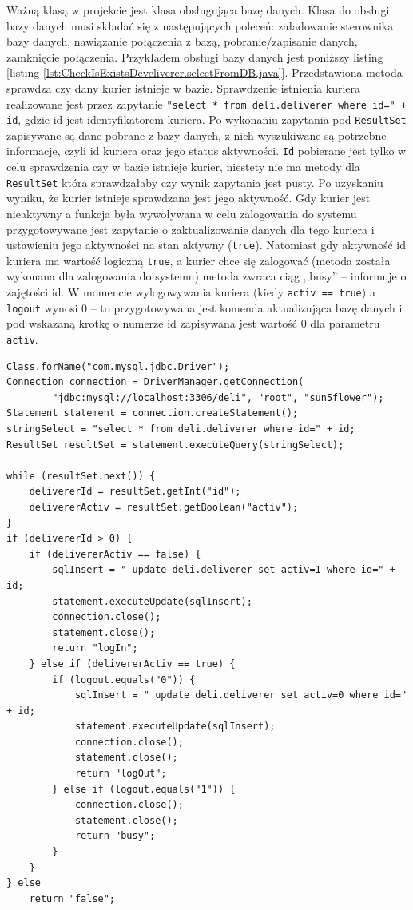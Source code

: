 \documentclass[eng,printmode,oneside]{mgr}
\begin{document}
Ważną klasą w projekcie jest klasa obsługująca bazę danych. Klasa do obsługi
bazy danych musi składać się z następujących poleceń: załadowanie sterownika
bazy danych, nawiązanie połączenia z bazą, pobranie/zapisanie danych, zamknięcie
połączenia. Przykładem obsługi bazy danych jest poniższy listing [listing
\ref{lst:CheckIsExistsDeveliverer.selectFromDB.java}]. Przedstawiona metoda
sprawdza czy dany kurier istnieje w bazie. Sprawdzenie istnienia
kuriera realizowane jest przez zapytanie \texttt{"select * from deli.deliverer where id=" + id}, gdzie id jest
identyfikatorem kuriera. Po wykonaniu zapytania pod \texttt{ResultSet}
zapisywane są dane pobrane z bazy danych, z nich wyszukiwane są potrzebne informacje, czyli
id kuriera oraz jego status aktywności. \texttt{Id} pobierane jest tylko w celu
sprawdzenia czy w bazie istnieje kurier, niestety nie ma metody dla
\texttt{ResultSet} która sprawdzałaby czy wynik zapytania jest pusty. Po
uzyskaniu wyniku, że kurier istnieje sprawdzana jest jego aktywność. Gdy kurier
jest nieaktywny a funkcja była wywoływana w celu zalogowania do systemu
przygotowywane jest zapytanie o zaktualizowanie danych dla tego kuriera i
ustawieniu jego aktywności na stan aktywny (\texttt{true}). Natomiast gdy
aktywność id kuriera ma wartość logiczną \texttt{true}, a kurier chce się
zalogować (metoda została wykonana dla zalogowania do systemu) metoda zwraca
ciąg ,,busy'' -- informuje o zajętości id.
W momencie wylogowywania kuriera (kiedy \texttt{activ == true}) a
\texttt{logout} wynosi 0 -- to przygotowywana jest komenda aktualizująca bazę
danych i pod wskazaną krotkę o numerze id zapisywana jest wartość 0 dla
parametru \texttt{activ}.

\begin{lstlisting}[caption=Połączenia z bazą danych na przykładzie metody
sprawdzającej istnienie kuriera oraz jego stan
używanej przez aplikację
mobilną,label=lst:CheckIsExistsDeveliverer.selectFromDB.java]
Class.forName("com.mysql.jdbc.Driver");
Connection connection = DriverManager.getConnection(
		"jdbc:mysql://localhost:3306/deli", "root", "sun5flower");
Statement statement = connection.createStatement();
stringSelect = "select * from deli.deliverer where id=" + id;
ResultSet resultSet = statement.executeQuery(stringSelect);

while (resultSet.next()) {
	delivererId = resultSet.getInt("id");
	delivererActiv = resultSet.getBoolean("activ");
} 
if (delivererId > 0) {
	if (delivererActiv == false) {
		sqlInsert = " update deli.deliverer set activ=1 where id=" + id;
		statement.executeUpdate(sqlInsert);
		connection.close();
		statement.close();
		return "logIn";
	} else if (delivererActiv == true) {
		if (logout.equals("0")) {
			sqlInsert = " update deli.deliverer set activ=0 where id=" + id;
			statement.executeUpdate(sqlInsert);
			connection.close();
			statement.close();
			return "logOut";
		} else if (logout.equals("1")) {
			connection.close();
			statement.close();
			return "busy";
		}
	}
} else
	return "false";
\end{lstlisting}
\end{document}
